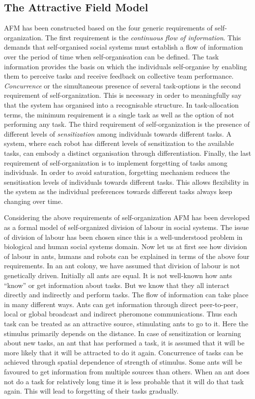 \documentclass[smallcondensed]{svjour3}
\begin{document}
\subsection{The Attractive Field Model}
\label{afm:framework}
AFM has been constructed based on the four generic requirements of self-organization. The first requirement is the \textit{continuous flow of information}. This demands that self-organised social systems must establish a flow of information over the period of time when self-organisation can be defined. The task information provides the basis on which the individuals self-organise by enabling them to perceive tasks and receive feedback on collective team performance.  \textit{Concurrence} or the simultaneous presence of several task-options is the second requirement of  self-organization. This is necessary in order to meaningfully say that the system has organised into a recognisable structure. In task-allocation terms, the minimum requirement is a single task as well as the option of not performing any task. The third requirement of self-organization is the presence of different levels of \textit{sensitization} among individuals towards different tasks. A system, where each robot has different levels of sensitization to the available tasks, can  embody a distinct organisation through differentiation. Finally, the last requirement of self-organization is to implement forgetting of tasks among individuals. In order to avoid saturation, forgetting mechanism reduces the sensitisation levels of individuals towards different tasks. This allows flexibility in the system as the individual preferences towards different tasks always keep changing over time. 

Considering the above requirements of self-organization AFM has been developed as a formal model of self-organized division of labour in social systems. The issue of division of labour has been chosen since this is a well-understood problem in biological and human social systems domain. Now let us at first see how division of labour in ants, humans and robots can be explained in terms of the above four requirements. In an ant colony, we have assumed that division of labour is not genetically driven. Initially all ants are equal. It is not well-known how ants ``know'' or get information about tasks. But we know that they all interact directly and indirectly and perform tasks. The flow of information can take place in many different ways. Ants can get information through direct peer-to-peer, local or global broadcast and indirect pheromone communications. Thus each task can be treated as an attractive source, stimulating ants to go to it. Here the stimulus primarily depends on the distance. In case of sensitization or learning about new tasks, an ant that has performed a task, it is assumed that it will be more likely that it will be attracted to do it again.  Concurrence of tasks  can  be achieved through spatial dependence of strength of stimulus. Some ants will be favoured to get information from multiple sources than others. When an ant does not do a task for relatively long time it is less probable that it will do that task again. This will lead to forgetting of their tasks gradually.  
\end{document}
